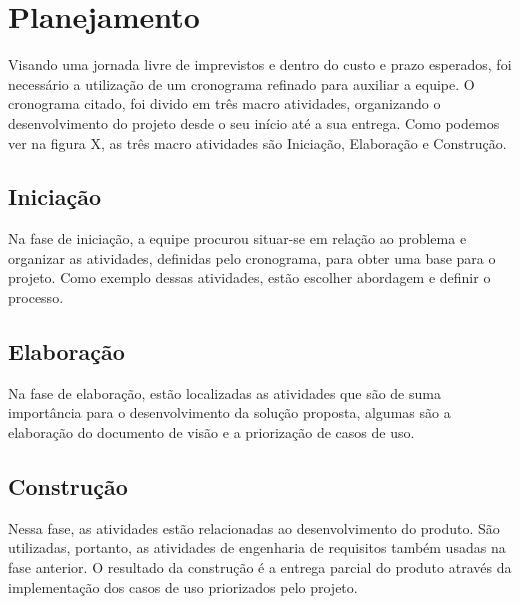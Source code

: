 \chapter{Planejamento}
\label{planning}

Visando uma jornada livre de imprevistos e dentro do custo e prazo esperados, foi necessário a utilização de um cronograma refinado para auxiliar a equipe. O cronograma citado, foi divido em três macro atividades, organizando o desenvolvimento do projeto desde o seu início até a sua entrega. Como podemos ver na figura X, as três macro atividades são Iniciação, Elaboração e Construção.

\section{Iniciação}

Na fase de iniciação, a equipe procurou situar-se em relação ao problema e organizar as atividades, definidas pelo cronograma, para obter uma base para o projeto. Como exemplo dessas atividades, estão escolher abordagem e definir o processo.

\section{Elaboração}

Na fase de elaboração, estão localizadas as atividades que são de suma importância para o desenvolvimento da solução proposta, algumas são a elaboração do documento de visão e a priorização de casos de uso.

\section{Construção}

Nessa fase, as atividades estão relacionadas ao desenvolvimento do produto. São utilizadas, portanto, as atividades de engenharia de requisitos também usadas na fase anterior. O resultado da construção é a entrega parcial do produto através da implementação dos casos de uso priorizados pelo projeto.

